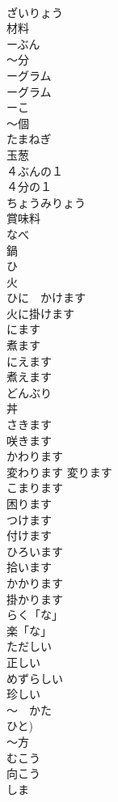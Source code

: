 \documentclass[8pt]{extreport}
\begin{document}
\begin{CJK}{UTF8}{min}
\\	ざいりょう	
\\	材料		
\\	ーぶん	
\\	〜分		
\\	ーグラム	
\\	ーグラム		
\\	ーこ	
\\	〜個		
\\	たまねぎ	
\\	玉葱		
\\	４ぶんの１	
\\	４分の１		
\\	ちょうみりょう	
\\	賞味料		
\\	なべ	
\\	鍋		
\\	ひ	
\\	火		
\\	ひに　かけます	
\\	火に掛けます		
\\	にます	
\\	煮ます		
\\	にえます	
\\	煮えます		
\\	どんぶり	
\\	丼		
\\	さきます	
\\	咲きます	
\\	かわります	
\\	変わります 変ります	
\\	こまります	
\\	困ります	
\\	つけます	
\\	付けます		
\\	ひろいます	
\\	拾います	
\\	かかります	
\\	掛かります	
\\	らく「な」	
\\	楽「な」		
\\	ただしい	
\\	正しい	
\\	めずらしい	
\\	珍しい		
\\	〜　かた	
\\	ひと) 
\\	〜方	
\\	むこう	
\\	向こう	
\\	しま	

\end{CJK}
\end{document}
